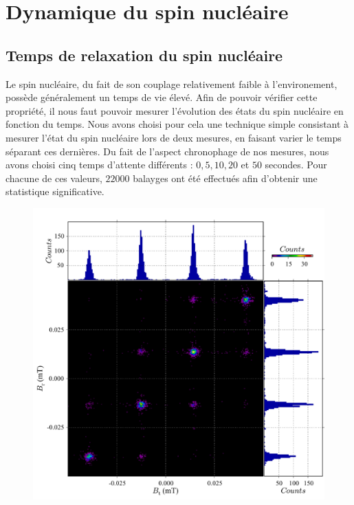 \section{Dynamique du spin nucléaire}

\subsection{Temps de relaxation du spin nucléaire}
Le spin nucléaire, du fait de son couplage relativement faible à l'environement, possède généralement un temps de vie élevé. Afin de pouvoir vérifier cette propriété, il nous faut pouvoir mesurer l'évolution des états du spin nucléaire en fonction du temps. Nous avons choisi pour cela une technique simple consistant à mesurer l'état du spin nucléaire lors de deux mesures, en faisant varier le temps séparant ces dernières. Du fait de l'aspect chronophage de nos mesures, nous avons choisi cinq temps d'attente différents : $0,5,10,20$ et $50$ secondes. Pour chacune de ces valeurs, $22000$ balayges ont été effectués afin d'obtenir une statistique significative.


\begin{figure}
\includegraphics[scale=0.45]{Resultats/Chap2/Figure1/figure1.pdf} 
\caption{}
\label{correlations}
\end{figure}

